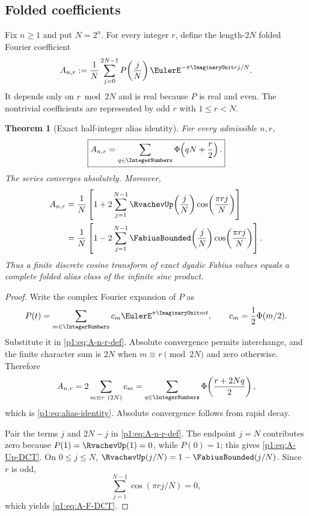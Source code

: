 \documentclass[11pt,oneside]{article}
\newtheorem{theorem}{Theorem}[section]
\theoremstyle{definition}
\theoremstyle{remark}
\newcommand{\PhiU}{\Phi}
\begin{document}
\subsection{Folded coefficients}

Fix $n\ge1$ and put $N=2^n$.  For every integer $r$, define the
length-$2N$ folded Fourier coefficient
\begin{equation}\label{p1:eq:A-n-r-def}
 A_{n,r}:=\frac1N\sum_{j=0}^{2N-1}
 P\!\left(\frac jN\right)\EulerE^{-\pi\ImaginaryUnit rj/N}.
\end{equation}
It depends only on $r\bmod 2N$ and is real because $P$ is real and even.  The
nontrivial coefficients are represented by odd $r$ with $1\le r<N$.

\begin{theorem}[Exact half-integer alias identity]\label{p1:thm:alias-identity}
For every admissible $n,r$,
\begin{equation}\label{p1:eq:alias-identity}
 \boxed{
 A_{n,r}=\sum_{q\in\IntegerNumbers}\PhiU\!\left(qN+\frac r2\right).}
\end{equation}
The series converges absolutely.  Moreover,
\begin{align}
 A_{n,r}
 &=\frac1N\left[1+2\sum_{j=1}^{N-1}
 \RvachevUp\!\left(\frac jN\right)
 \cos\!\left(\frac{\pi rj}{N}\right)\right]
 \label{p1:eq:A-Up-DCT}\\
 &=\frac1N\left[1-2\sum_{j=1}^{N-1}
 \FabiusBounded\!\left(\frac jN\right)
 \cos\!\left(\frac{\pi rj}{N}\right)\right].
 \label{p1:eq:A-F-DCT}
\end{align}
Thus a finite discrete cosine transform of exact dyadic Fabius values equals a
complete folded alias class of the infinite sinc product.
\end{theorem}

\begin{proof}
Write the complex Fourier expansion of $P$ as
\[
 P(t)=\sum_{m\in\IntegerNumbers}c_m\EulerE^{\pi\ImaginaryUnit mt},
 \qquad c_m=\frac12\PhiU(m/2).
\]
Substitute it in \eqref{p1:eq:A-n-r-def}.  Absolute convergence permits
interchange, and the finite character sum is $2N$ when $m\equiv r\pmod{2N}$
and zero otherwise.  Therefore
\[
 A_{n,r}=2\sum_{m\equiv r\ (2N)}c_m
 =\sum_{q\in\IntegerNumbers}\PhiU\!\left(\frac{r+2Nq}{2}\right),
\]
which is \eqref{p1:eq:alias-identity}.  Absolute convergence follows from rapid
decay.

Pair the terms $j$ and $2N-j$ in \eqref{p1:eq:A-n-r-def}.  The endpoint
$j=N$ contributes zero because $P(1)=\RvachevUp(1)=0$, while $P(0)=1$; this gives
\eqref{p1:eq:A-Up-DCT}.  On $0\le j\le N$,
$\RvachevUp(j/N)=1-\FabiusBounded(j/N)$.  Since $r$ is odd,
\[
 \sum_{j=1}^{N-1}\cos(\pi rj/N)=0,
\]
which yields \eqref{p1:eq:A-F-DCT}.
\end{proof}
\end{document}
